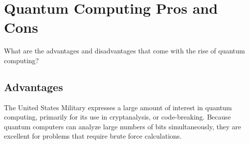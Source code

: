 \documentclass[10pt,journal,compsoc]{IEEEtran}
\begin{document}
%






\section{Quantum Computing Pros and Cons}
What are the advantages and disadvantages that come with the rise of quantum computing?
\subsection{Advantages}
The United States Military expresses a large amount of interest in quantum computing, primarily for its use in cryptanalysis, or code-breaking. Because quantum computers can analyze large numbers of bits simultaneously, they are excellent for problems that require brute force calculations. 
\end{document}
